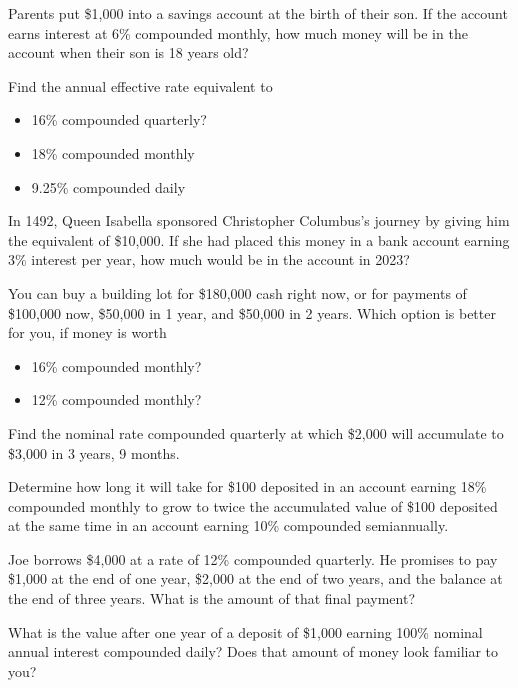 \documentclass[12pt]{exam}
\begin{document}
\vspace{2in}  %

\begin{questions}

    \question Parents put \$1,000 into a savings account at the birth of their son.  If the account earns
    interest at 6\% compounded monthly, how much money will be in the account when their son is 18 years old?
    \vspace{1.25in}

    \question Find the annual effective rate equivalent to
    \begin{itemize}
        \item 16\% compounded quarterly?
        \item 18\% compounded monthly
        \item 9.25\% compounded daily
    \end{itemize}
    \vspace{1.5in}

    \question In 1492, Queen Isabella sponsored Christopher Columbus's journey by giving  him the equivalent of \$10,000.
    If she had placed this money in a bank account earning 3\% interest per year, how much would be in the account in 2023?
    \vspace{1.5in}

    \question You can buy a building lot for \$180,000 cash right now, or for payments of \$100,000 now, \$50,000 in 1 year,
    and \$50,000 in 2 years.  Which option is better for you, if money is worth
    \begin{itemize}
        \item 16\% compounded monthly?
        \item 12\% compounded monthly?
    \end{itemize}
    \vspace{2in}

    \question Find the nominal rate compounded quarterly at which \$2,000 will accumulate to \$3,000 in 3 years, 9 months.
    \vspace{2in}

    \question Determine how long it will take for \$100 deposited in an account earning 18\% compounded monthly to
    grow to twice the accumulated value of \$100 deposited at the same time in an account earning 10\% compounded semiannually.
    \vspace{2in}

    \question Joe borrows \$4,000 at a rate of 12\% compounded quarterly.  He promises to pay \$1,000 at the end of one year, \$2,000
    at the end of two years, and the balance at the end of three years.  What is the amount of that final payment?
    \vspace{2in}

    \question What is the value after one year of a deposit of \$1,000 earning 100\% nominal annual interest compounded daily?
    Does that amount of money look familiar to you?

\end{questions}
\end{document}
